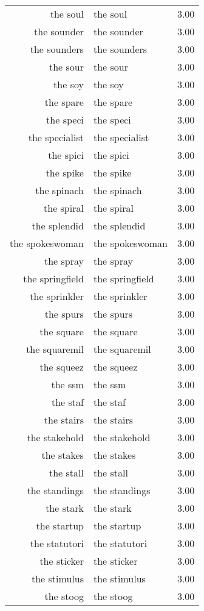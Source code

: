 \begin{table}[ht]
\begin{tabular}{rlr}
  the soul & the soul & 3.00 \\ 
  the sounder & the sounder & 3.00 \\ 
  the sounders & the sounders & 3.00 \\ 
  the sour & the sour & 3.00 \\ 
  the soy & the soy & 3.00 \\ 
  the spare & the spare & 3.00 \\ 
  the speci & the speci & 3.00 \\ 
  the specialist & the specialist & 3.00 \\ 
  the spici & the spici & 3.00 \\ 
  the spike & the spike & 3.00 \\ 
  the spinach & the spinach & 3.00 \\ 
  the spiral & the spiral & 3.00 \\ 
  the splendid & the splendid & 3.00 \\ 
  the spokeswoman & the spokeswoman & 3.00 \\ 
  the spray & the spray & 3.00 \\ 
  the springfield & the springfield & 3.00 \\ 
  the sprinkler & the sprinkler & 3.00 \\ 
  the spurs & the spurs & 3.00 \\ 
  the square & the square & 3.00 \\ 
  the squaremil & the squaremil & 3.00 \\ 
  the squeez & the squeez & 3.00 \\ 
  the ssm & the ssm & 3.00 \\ 
  the staf & the staf & 3.00 \\ 
  the stairs & the stairs & 3.00 \\ 
  the stakehold & the stakehold & 3.00 \\ 
  the stakes & the stakes & 3.00 \\ 
  the stall & the stall & 3.00 \\ 
  the standings & the standings & 3.00 \\ 
  the stark & the stark & 3.00 \\ 
  the startup & the startup & 3.00 \\ 
  the statutori & the statutori & 3.00 \\ 
  the sticker & the sticker & 3.00 \\ 
  the stimulus & the stimulus & 3.00 \\ 
  the stoog & the stoog & 3.00 \\ 

\end{tabular}
\end{table}
